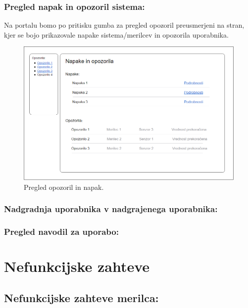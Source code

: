 \documentclass[12pt,a4paper,titlepage,openany]{report}
\begin{document}
\subsubsection{Pregled napak in opozoril sistema:}
Na portalu bomo po pritisku gumba za pregled opozoril preusmerjeni na stran, kjer se bojo prikazovale napake sistema/merilcev in opozorila uporabnika. 

\begin{figure}[H]
\begin{center}
\includegraphics[width=1\linewidth]{Slike/PregledOpozorilInNapak.png}
\end{center}
\caption{Pregled opozoril in napak.}\label{slika:PregledOpozorilInNapak}
\end{figure}


\subsubsection{Nadgradnja uporabnika v nadgrajenega uporabnika:}

\subsubsection{Pregled navodil za uporabo:}

\section{Nefunkcijske zahteve}
\thispagestyle{fancy}


\subsection{Nefunkcijske zahteve merilca:}
\end{document}
